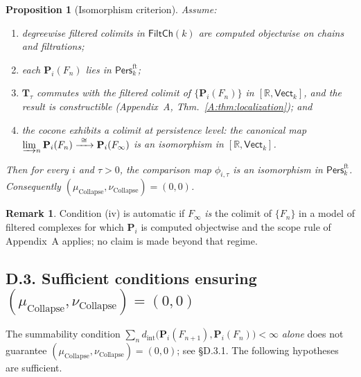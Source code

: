\documentclass[11pt]{article}
\newcommand{\Pers}{\mathsf{Pers}}
\numberwithin{equation}{section}
\newtheorem{proposition}[theorem]{Proposition}
\theoremstyle{definition}
\newtheorem{remark}[theorem]{Remark}
\DeclareRobustCommand{\muc}{\mu_{\mathrm{Collapse}}}
\DeclareRobustCommand{\nuc}{\nu_{\mathrm{Collapse}}}
\begin{document}
\begin{proposition}[Isomorphism criterion]\label{D:prop:iso-zero}
Assume:
\begin{enumerate}
\item[(i)] degreewise filtered colimits in \(\mathsf{FiltCh}(k)\) are computed objectwise on chains and filtrations;
\item[(ii)] each \(\mathbf{P}_i(F_n)\) lies in \(\Pers^{\mathrm{ft}}_k\);
\item[(iii)] \(\mathbf{T}_\tau\) commutes with the filtered colimit of \(\{\mathbf{P}_i(F_n)\}\) in \([\mathbb{R},\mathsf{Vect}_k]\), and the result is constructible \emph{(Appendix~A, Thm.~\ref{A:thm:localization})}; and
\item[(iv)] the cocone exhibits a colimit at persistence level: the canonical map
\(\varinjlim_{n}\mathbf{P}_i(F_n)\xrightarrow{\ \cong\ }\mathbf{P}_i(F_\infty)\)
is an isomorphism in \([\mathbb{R},\mathsf{Vect}_k]\).
\end{enumerate}
Then for every \(i\) and \(\tau>0\), the comparison map \(\phi_{i,\tau}\) is an isomorphism in \(\Pers^{\mathrm{ft}}_k\).
Consequently \((\muc,\nuc)=(0,0)\).
\end{proposition}

\begin{remark}
Condition (iv) is automatic if \(F_\infty\) \emph{is} the colimit of \(\{F_n\}\) in a model of filtered complexes for which \(\mathbf{P}_i\) is computed objectwise and the scope rule of Appendix~A applies; no claim is made beyond that regime.
\end{remark}

\subsection*{D.3. Sufficient conditions ensuring \texorpdfstring{$(\muc,\nuc)=(0,0)$}{(mu,nu)=(0,0)}}

The summability condition \(\sum_{n} d_{\mathrm{int}}\!\big(\mathbf{P}_i(F_{n+1}),\mathbf{P}_i(F_n)\big)<\infty\) \emph{alone} does not guarantee \((\muc,\nuc)=(0,0)\); see §D.3.1.
The following hypotheses are sufficient.
\end{document}

